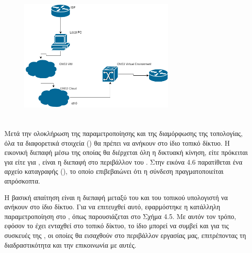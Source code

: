\begin{figure}[htb]
	\centering
	\includegraphics[width=0.7\textwidth]{graphics/diagram.drawio.png}
	\caption{ }
\end{figure}









\section{ }


Μετά την ολοκλήρωση της παραμετροποίησης και της διαμόρφωσης της τοπολογίας, όλα τα διαφορετικά στοιχεία () 
θα πρέπει να ανήκουν στο ίδιο τοπικό δίκτυο. Η εικονική διεπαφή μέσω της οποίας θα διέρχεται όλη η δικτυακή κίνηση, είτε πρόκειται για 
είτε για , είναι η διεπαφή  στο περιβάλλον του . Στην εικόνα 4.6 παρατίθεται ένα αρχείο καταγραφής (), 
το οποίο επιβεβαιώνει ότι η σύνδεση πραγματοποιείται απρόσκοπτα.

Η βασική απαίτηση είναι η διεπαφή μεταξύ του  και του τοπικού υπολογιστή να ανήκουν στο ίδιο δίκτυο. 
Για να επιτευχθεί αυτό, εφαρμόστηκε η κατάλληλη παραμετροποίηση στο , όπως παρουσιάζεται στο Σχήμα 4.5. 
Με αυτόν τον τρόπο, εφόσον το  έχει ενταχθεί στο τοπικό δίκτυο, το ίδιο μπορεί να συμβεί και για τις συσκευές της 
, οι οποίες θα εισαχθούν στο περιβάλλον εργασίας μας, επιτρέποντας τη διαδραστικότητα και την επικοινωνία με αυτές.


